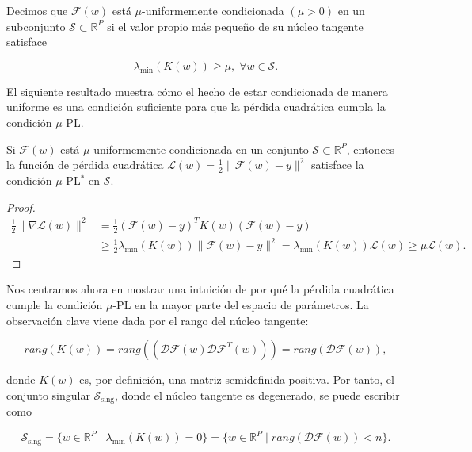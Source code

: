 \begin{definicion}
    Decimos que $\mathcal{F}(w)$ está $\mu$-uniformemente condicionada $(\mu > 0)$ en un subconjunto $\mathcal{S} \subset \mathbb{R}^{P}$ si el valor propio más pequeño de su núcleo tangente satisface

    \[
        \lambda_{\min}(K(w)) \geq \mu, \; \forall w \in \mathcal{S}.
    \]
\end{definicion}

El siguiente resultado muestra cómo el hecho de estar condicionada de manera uniforme es una condición suficiente para que la pérdida cuadrática cumpla la condición $\mu$-PL.

\begin{teorema}
    Si $\mathcal{F}(w)$ está $\mu$-uniformemente condicionada en un conjunto $\mathcal{S} \subset \mathbb{R}^P$, entonces la función de pérdida cuadrática $\mathcal{L}(w) = \frac{1}{2} \|\mathcal{F}(w) - y \|^2$ satisface la condición $\mu$-PL$^*$ en $\mathcal{S}$.
\end{teorema}

\begin{proof}
    \[
        \begin{aligned}
            \frac{1}{2} \|\nabla \mathcal{L}(w)\|^2 &= \frac{1}{2} (\mathcal{F}(w) - y)^T K(w) (\mathcal{F}(w) - y) \\
            &\geq \frac{1}{2} \lambda_{\min}(K(w)) \|\mathcal{F}(w) - y \|^2 = \lambda_{\min}(K(w)) \mathcal{L}(w) \geq \mu \mathcal{L}(w).
        \end{aligned}
    \]

\end{proof}

Nos centramos ahora en mostrar una intuición de por qué la pérdida cuadrática cumple la condición $\mu$-PL en la mayor parte del espacio de parámetros. La observación clave viene dada por el rango del núcleo tangente:

\[
        rang(K(w)) = rang((\mathcal{DF}(w) \mathcal{DF}^T(w))) = rang(\mathcal{DF}(w)),
\]

donde $K(w)$ es, por definición, una matriz semidefinida positiva. Por tanto, el conjunto singular $\mathcal{S}_{\text{sing}}$, donde el núcleo tangente es degenerado, se puede escribir como

\[
    \mathcal{S}_{\text{sing}} = \{w \in \mathbb{R}^P \mid \lambda_{\min}(K(w)) = 0\} = \{w \in \mathbb{R}^P \mid rang(\mathcal{DF}(w)) < n\}.
\]

